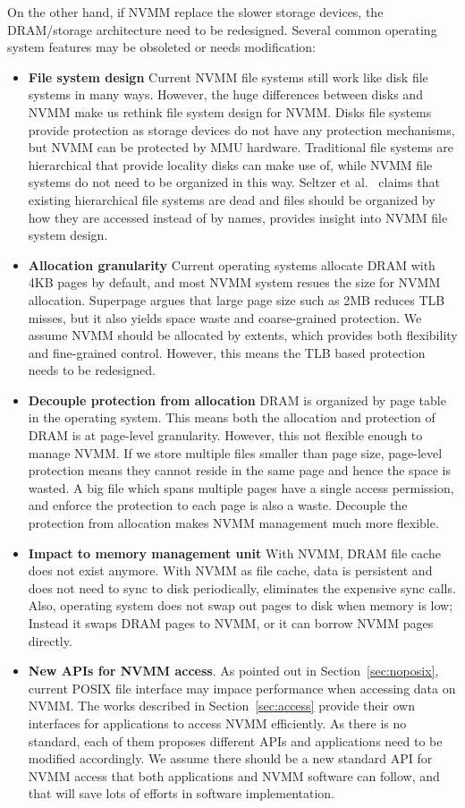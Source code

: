 On the other hand, if NVMM replace the slower storage devices, the DRAM/storage
architecture need to be redesigned. Several common operating system features
may be obsoleted or needs modification:
\begin{itemize}
\item \textbf{File system design}
Current NVMM file systems still work like disk file systems in many ways.
However, the huge differences between disks and NVMM make us rethink file
system design for NVMM.
Disks file systems provide protection as storage devices do not have any
protection mechanisms, but NVMM can be protected by MMU hardware.
Traditional file systems are hierarchical
that provide locality disks can make use of, while NVMM file systems do not
need to be organized in this way.
Seltzer et al.~\cite{Seltzer} claims that
existing hierarchical file systems are dead and files should be organized by
how they are accessed instead of by names, provides insight into NVMM file
system design.
\item \textbf{Allocation granularity}
Current operating systems allocate DRAM with 4KB pages by default,
and most NVMM system resues the size for NVMM allocation. Superpage argues
that large page size such as 2MB reduces TLB misses, but it also yields
space waste and coarse-grained protection. We assume NVMM should be allocated
by extents, which provides both flexibility and fine-grained control. However,
this means the TLB based protection needs to be redesigned.
\item \textbf{Decouple protection from allocation} DRAM is organized by 
page table in the operating system. This means both the allocation and
protection of DRAM is at page-level granularity. However, this not flexible
enough to manage NVMM. If we store multiple files smaller than page size,
page-level protection means they cannot reside in the same page and hence
the space is wasted. A big file which spans multiple pages have a single
access permission, and enforce the protection to each page is also a waste.
Decouple the protection from allocation makes NVMM management much more
 flexible.
\item \textbf{Impact to memory management unit}
With NVMM, DRAM file cache does not exist anymore. With NVMM as file cache,
data is persistent and does not need to sync to disk periodically, eliminates
the expensive sync calls.
Also, operating system does not swap out pages to disk when memory is low;
Instead it swaps DRAM pages to NVMM, or it can borrow NVMM pages directly.
\item \textbf{New APIs for NVMM access}.
As pointed out in Section~\ref{sec:noposix}, current POSIX file 
interface may impace performance when accessing data on NVMM.
The works described in Section~\ref{sec:access} provide their own interfaces
for applications to access NVMM efficiently. As there is no standard, each of
them proposes different APIs and applications need to be modified accordingly.
We assume there should be a new standard API for NVMM access that both
applications and NVMM software can follow, and that will save lots of efforts
in software implementation. 
\end{itemize}

